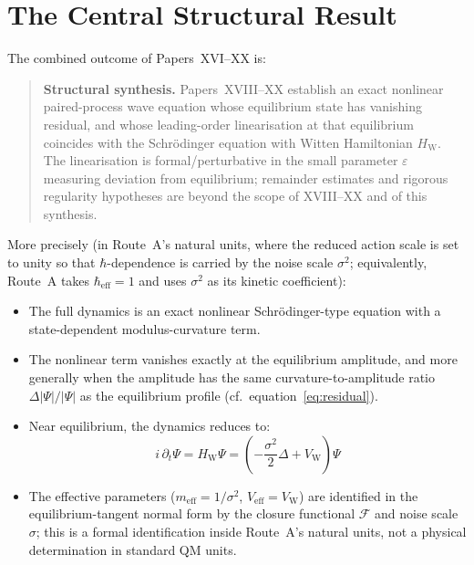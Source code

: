 \documentclass[12pt]{article}
\newcommand{\Fcal}{\mathcal{F}}
\newcommand{\VW}{V_{\mathrm{W}}}
\newcommand{\HW}{H_{\mathrm{W}}}
\begin{document}
\section{The Central Structural Result}\label{sec:result}

The combined outcome of Papers~XVI--XX is:

\begin{quote}
\textbf{Structural synthesis.} Papers~XVIII--XX establish an exact nonlinear paired-process wave equation whose equilibrium state has vanishing residual, and whose leading-order linearisation at that equilibrium coincides with the Schr\"odinger equation with Witten Hamiltonian $\HW$. The linearisation is formal/perturbative in the small parameter $\varepsilon$ measuring deviation from equilibrium; remainder estimates and rigorous regularity hypotheses are beyond the scope of XVIII--XX and of this synthesis.
\end{quote}

More precisely (in Route~A's natural units, where the reduced action scale is set to unity so that $\hbar$-dependence is carried by the noise scale $\sigma^2$; equivalently, Route~A takes $\hbar_{\mathrm{eff}} = 1$ and uses $\sigma^2$ as its kinetic coefficient):
\begin{itemize}
    \item The full dynamics is an exact nonlinear Schr\"odinger-type equation with a state-dependent modulus-curvature term.
    \item The nonlinear term vanishes exactly at the equilibrium amplitude, and more generally when the amplitude has the same curvature-to-amplitude ratio $\Delta|\Psi|/|\Psi|$ as the equilibrium profile (cf.~equation~\eqref{eq:residual}).
    \item Near equilibrium, the dynamics reduces to:
    \begin{equation}
        i\,\partial_t\Psi = \HW\Psi = \left(-\frac{\sigma^2}{2}\Delta + \VW\right)\Psi
    \end{equation}
    \item The effective parameters ($m_{\mathrm{eff}} = 1/\sigma^2$, $V_{\mathrm{eff}} = \VW$) are identified in the equilibrium-tangent normal form by the closure functional $\Fcal$ and noise scale $\sigma$; this is a formal identification inside Route~A's natural units, not a physical determination in standard QM units.
\end{itemize}
\end{document}
